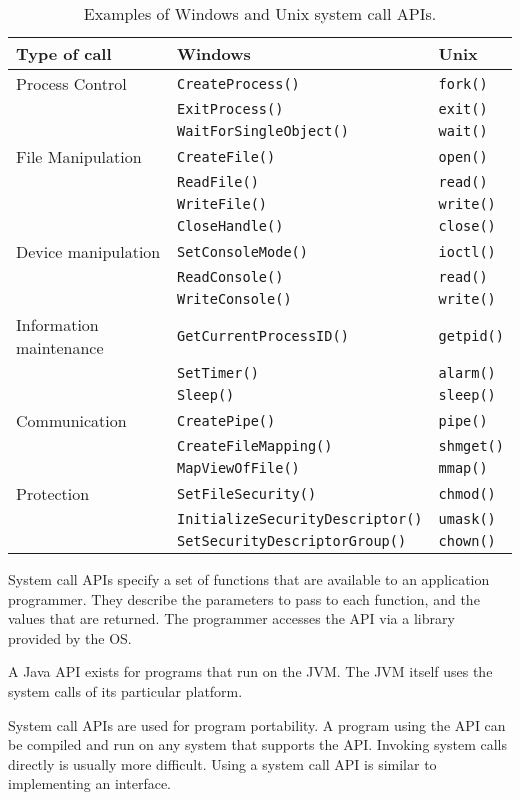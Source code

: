 \begin{table}[htp]
  \centering
  \caption*{Examples of Windows and Unix system call APIs.}
  \begin{tabular}{lll}
    \toprule
    Type of call & Windows & Unix \\
    \midrule
    Process Control & \texttt{CreateProcess()}       & \texttt{fork()} \\
                    & \texttt{ExitProcess()}         & \texttt{exit()} \\
                    & \texttt{WaitForSingleObject()} & \texttt{wait()} \\
    File Manipulation & \texttt{CreateFile()}  & \texttt{open()}  \\
                      & \texttt{ReadFile()}    & \texttt{read()}  \\
                      & \texttt{WriteFile()}   & \texttt{write()} \\
                      & \texttt{CloseHandle()} & \texttt{close()} \\
    Device manipulation & \texttt{SetConsoleMode()} & \texttt{ioctl()} \\
                        & \texttt{ReadConsole()}    & \texttt{read()}  \\
                        & \texttt{WriteConsole()}   & \texttt{write()} \\
    Information maintenance & \texttt{GetCurrentProcessID()} & \texttt{getpid()} \\
                            & \texttt{SetTimer()}            & \texttt{alarm()}  \\
                            & \texttt{Sleep()}               & \texttt{sleep()}  \\
    Communication & \texttt{CreatePipe()}        & \texttt{pipe()}   \\
                  & \texttt{CreateFileMapping()} & \texttt{shmget()} \\
                  & \texttt{MapViewOfFile()}     & \texttt{mmap()}   \\
    Protection & \texttt{SetFileSecurity()}              & \texttt{chmod()} \\
               & \texttt{InitializeSecurityDescriptor()} & \texttt{umask()} \\
               & \texttt{SetSecurityDescriptorGroup()}   & \texttt{chown()} \\
    \bottomrule
  \end{tabular}
\end{table}

System call APIs specify a set of functions that are available to an application programmer.
They describe the parameters to pass to each function, and the values that are returned.
The programmer accesses the API via a library provided by the OS.

A Java API exists for programs that run on the JVM.
The JVM itself uses the system calls of its particular platform.

System call APIs are used for program portability.
A program using the API can be compiled and run on any system that supports the API.
Invoking system calls directly is usually more difficult.
Using a system call API is similar to implementing an interface.

